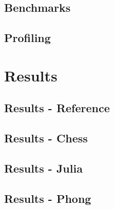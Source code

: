 \documentclass{beamer}
\begin{document}
	\subsection{Benchmarks}
	
	\subsection{Profiling}
	

	\section{Results}
	\subsection{Results - Reference}
	
	\subsection{Results - Chess}
	
	\subsection{Results - Julia}
	
	\subsection{Results - Phong}
	

	

\end{document}
